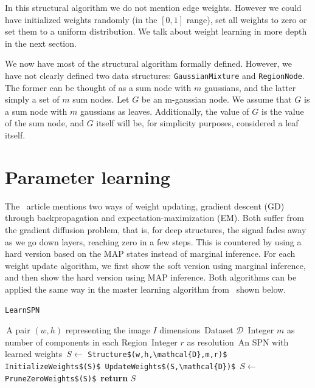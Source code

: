 \documentclass{amsart}
\theoremstyle{plain}
\numberwithin{equation}{section}
\newcommand{\code}[1]{\lstinline[mathescape=true]{#1}}
\newcommand{\mcode}[1]{\lstinline[mathescape]!#1!}
\begin{document}
In this structural algorithm we do not mention edge weights. However we could have initialized
weights randomly (in the $[0,1]$ range), set all weights to zero or set them to a uniform
distribution. We talk about weight learning in more depth in the next section.

We now have most of the structural algorithm formally defined. However, we have not clearly defined
two data structures: \code{GaussianMixture} and \code{RegionNode}. The former can be thought of as
a sum node with $m$ gaussians, and the latter simply a set of $m$ sum nodes. Let $G$ be an
m-gaussian node. We assume that $G$ is a sum node with $m$ gaussians as leaves. Additionally, the
value of $G$ is the value of the sum node, and $G$ itself will be, for simplicity purposes,
considered a leaf itself.

\section{Parameter learning}

The~\cite{poon-domingos} article mentions two ways of weight updating, gradient descent (GD)
through backpropagation and expectation-maximization (EM). Both suffer from the gradient diffusion
problem, that is, for deep structures, the signal fades away as we go down layers, reaching zero in
a few steps.  This is countered by using a hard version based on the MAP states instead of marginal
inference. For each weight update algorithm, we first show the soft version using marginal
inference, and then show the hard version using MAP inference. Both algorithms can be applied the
same way in the master learning algorithm from~\cite{poon-domingos} shown below.

\begin{algorithm}[h]
  \caption{\code{LearnSPN}}\label{alg:learnspn}
  \begin{algorithmic}[1]
    \Require\,A pair $(w,h)$ representing the image $I$ dimensions
    \Require\,Dataset $\mathcal{D}$
    \Require\,Integer $m$ as number of components in each Region
    \Require\,Integer $r$ as resolution
    \Ensure\,An SPN with learned weights
    \State\,$S\gets$ \mcode{Structure$(w,h,\mathcal{D},m,r)$}
    \State\,\mcode{InitializeWeights$(S)$}
    \Repeat%
      \State\,\mcode{UpdateWeights$(S,\mathcal{D})$}
    \State\,$S\gets$ \mcode{PruneZeroWeights$(S)$}
    \State\,\textbf{return} $S$
  \end{algorithmic}
\end{algorithm}
\end{document}
